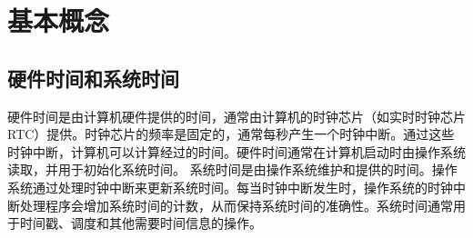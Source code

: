 \documentclass[12pt,hyperref,a4paper,UTF8]{ctexart}
\begin{document}
\cover
\thispagestyle{empty} %



\newpage
\begin{abstract}

    本文详细介绍了 Linux 内核中的 \lstinline|time| 系统调用，包括其功能简介、传递参数、返回值和应用示例。通过阅读内核源码的方式，对比了现代内核中的 \lstinline|time| 系统调用和 0.11 版本内核中的 \lstinline|sys_time| 系统调用，分析了它们在实现方式、参数处理、错误处理、时间获取方式和向后兼容性方面的差异。
    
    本文还深入分析了 \lstinline|ktime_get_real_seconds()| 函数和 \lstinline|timekeeper| 结构体的实现，并讨论了 \lstinline|put_user()| 和 \lstinline|force_successful_syscall_return()| 宏的功能。它们是\lstinline|time| 系统调用实现中的重要组成部分。
    
    通过这些分析，能更好地理解 Linux 内核时间管理机制的演变和实现细节。


\end{abstract}

\vspace{1cm}

\tableofcontents

\newpage


\section{基本概念}
\subsection{硬件时间和系统时间}

硬件时间是由计算机硬件提供的时间，通常由计算机的时钟芯片（如实时时钟芯片RTC）提供。时钟芯片的频率是固定的，通常每秒产生一个时钟中断。通过这些时钟中断，计算机可以计算经过的时间。硬件时间通常在计算机启动时由操作系统读取，并用于初始化系统时间。
系统时间是由操作系统维护和提供的时间。操作系统通过处理时钟中断来更新系统时间。每当时钟中断发生时，操作系统的时钟中断处理程序会增加系统时间的计数，从而保持系统时间的准确性。系统时间通常用于时间戳、调度和其他需要时间信息的操作。
\end{document}
